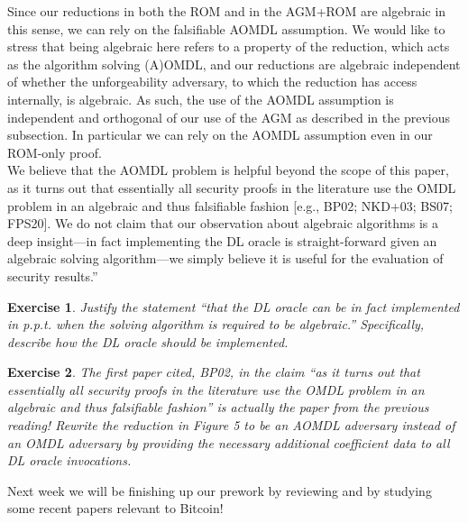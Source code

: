 \documentclass[12pt]{article}
\newtheorem{exercise}{Exercise}
\theoremstyle{definition}
\theoremstyle{remark}
\theoremstyle{definition}
\begin{document}
Since our reductions in both the ROM and in the AGM+ROM are algebraic in this sense, we can rely on the falsifiable AOMDL assumption. We would like to stress that being algebraic here refers to a property of the reduction, which acts as the algorithm solving (A)OMDL, and our reductions are algebraic independent of whether the unforgeability adversary, to which the reduction has access internally, is algebraic. As such, the use of the AOMDL assumption is independent and orthogonal of our use of the AGM as described in the previous subsection. In particular we can rely on the AOMDL assumption even in our ROM-only proof.\\

We believe that the AOMDL problem is helpful beyond the scope of this paper, as it turns out that essentially all security proofs in the literature use the OMDL problem in an algebraic and thus falsifiable fashion [e.g., BP02; NKD+03; BS07; FPS20]. We do not claim that our observation about algebraic algorithms is a deep insight---in fact implementing the DL oracle is straight-forward given an algebraic solving algorithm---we simply believe it is useful for the evaluation of security results.''

\begin{exercise}
Justify the statement ``that the DL oracle can be in fact implemented in p.p.t. when the solving algorithm is required to be algebraic.'' Specifically, describe how the DL oracle should be implemented.
\end{exercise}

\begin{exercise}
The first paper cited, BP02, in the claim ``as it turns out that essentially all security proofs in the literature use the OMDL problem in an algebraic and thus falsifiable fashion'' is actually the paper from the previous reading! Rewrite the reduction in Figure 5 to be an AOMDL adversary instead of an OMDL adversary by providing the necessary additional coefficient data to all DL oracle invocations.
\end{exercise}

Next week we will be finishing up our prework by reviewing and by studying some recent papers relevant to Bitcoin!
\end{document}
